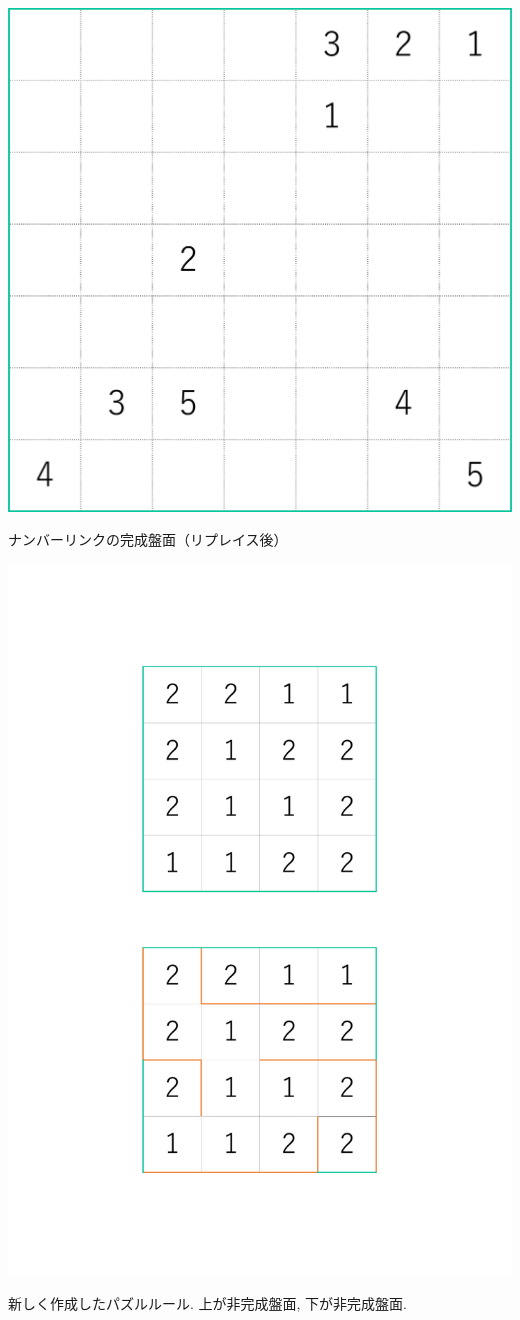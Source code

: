 \begin{clearpagefigure}
  \includegraphics[width=0.85\linewidth,clip]{fig/NumberLinkQuestionReplace.eps}
  \caption{ナンバーリンクの完成盤面（リプレイス後）}
  \label{figure:NumberLinkQuestionReplace}
\end{clearpagefigure}

\begin{clearpagefigure}
  \includegraphics[width=0.85\linewidth,clip]{fig/NewPuzzleRule.pdf}
  \caption{新しく作成したパズルルール. 上が非完成盤面, 下が非完成盤面. }
  \label{figure:NewPuzzleRule}
\end{clearpagefigure}

